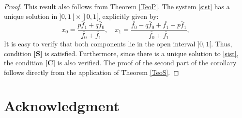 \documentclass[11pt,reqno]{amsart}
\theoremstyle{definition}
\begin{document}
 \begin{proof}
This result also follows from Theorem \ref{TeoP}. The system \eqref{sist} has a unique solution in $]0,1[ \times \,]0,1[$, explicitly given by: 
$$x_0= \frac{\overline{pf_1}+\overline{qf_0}}{\overline{f_0}+\overline{f_1}},\quad  x_1=\frac{\overline{f_0}-\overline{qf_0}+\overline{f_1}-\overline{pf_1}}{\overline{f_0}+\overline{f_1}},$$
It is easy to verify that both components lie in the open interval $]0,1[$. Thus, condition \textbf{[S]} is satisfied. Furthermore, since there is a unique solution to \eqref{sist}, the condition \textbf{[C]} is also verified. The proof of the second part of the corollary follows directly from the application of Theorem \ref{TeoS}.
\end{proof}

\section*{Acknowledgment}





\end{document}
